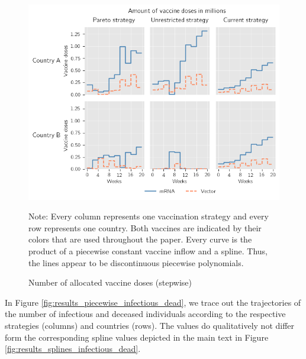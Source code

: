 \begin{figure}[h!]
\centering
\includegraphics[scale=0.6]{images/piecewise_vaccine_total_quantity.png}
\begin{flushleft}
\scriptsize{Note:} Every column represents one vaccination strategy and every row represents one country. Both vaccines are indicated by their colors that are used throughout the paper. 
Every curve is the product of a piecewise constant vaccine inflow and a spline. Thus, the lines appear to be discontinuous piecewise polynomials. 
\end{flushleft}
\caption{Number of allocated vaccine doses (stepwise)}
\label{fig:results_piecewise_allocation}
\end{figure}
In Figure \ref{fig:results_piecewise_infectious_dead}, we trace out the trajectories of the number of infectious and deceased individuals according to the respective strategies (columns) and countries (rows). The values do qualitatively not differ form the corresponding spline values depicted in the main text in Figure \ref{fig:results_splines_infectious_dead}.\\

